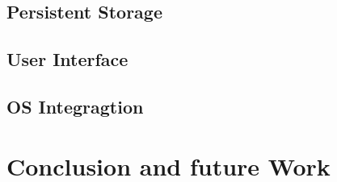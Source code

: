 \documentclass[11pt,a4paper]{scrreprt}
\begin{document}
\section{Persistent Storage} %
\label{sec:android_pers_storage}




\section{User Interface} %
\label{sec:user_interface}


\section{OS Integragtion} %
\label{sec:android_integration}


\chapter{Conclusion and future Work} %
\label{chp:platform_choice}


%
%
\end{document}
